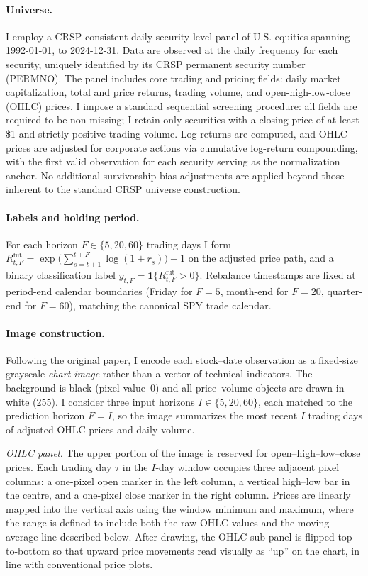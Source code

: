 \documentclass{article}
\begin{document}
\paragraph{Universe.}
I employ a CRSP-consistent daily security-level panel of U.S. equities
spanning 1992-01-01, to 2024-12-31. Data are observed at the
daily frequency for each security, uniquely identified by its CRSP permanent
security number (PERMNO). The panel includes core trading and pricing
fields: daily market capitalization, total and price returns, trading
volume, and open-high-low-close (OHLC) prices. I impose a standard
sequential screening procedure: all fields are required to be non-missing;
I retain only securities with a closing price of at least \$1 and strictly
positive trading volume. Log returns are computed, and OHLC prices are
adjusted for corporate actions via cumulative log-return compounding, with
the first valid observation for each security serving as the normalization
anchor. No additional survivorship bias adjustments are applied beyond those
inherent to the standard CRSP universe construction.

\paragraph{Labels and holding period.}
For each horizon $F\in\{5,20,60\}$ trading days I form
$R^{\mathrm{fut}}_{t,F}=\exp\!\bigl(\sum_{s=t+1}^{t+F}\log(1+r_s)\bigr)-1$ on
the adjusted price path, and a binary classification label
$y_{t,F}=\mathbf{1}\{R^{\mathrm{fut}}_{t,F}>0\}$. Rebalance timestamps are
fixed at period-end calendar boundaries (Friday for $F=5$, month-end for
$F=20$, quarter-end for $F=60$), matching the canonical SPY trade calendar.

\paragraph{Image construction.}
Following the original paper, I encode each stock--date
observation as a fixed-size grayscale \emph{chart image} rather than a
vector of technical indicators. The background is black (pixel value~0)
and all price--volume objects are drawn in white (255). I consider three
input horizons $I\in\{5,20,60\}$, each matched to the prediction horizon
$F=I$, so the image summarizes the most recent $I$ trading days of adjusted
OHLC prices and daily volume.

\emph{OHLC panel.}
The upper portion of the image is reserved for open--high--low--close
prices. Each trading day $\tau$ in the $I$-day window occupies three
adjacent pixel columns: a one-pixel open marker in the left column, a
vertical high--low bar in the centre, and a one-pixel close marker in the
right column. Prices are linearly mapped into the vertical axis using the
window minimum and maximum, where the range is defined to include both the
raw OHLC values and the moving-average line described below. After drawing,
the OHLC sub-panel is flipped top-to-bottom so that upward price movements
read visually as ``up'' on the chart, in line with conventional price
plots.
\end{document}
